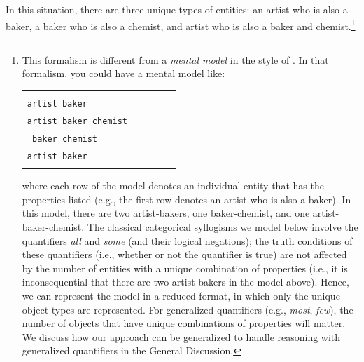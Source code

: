 \documentclass[floatsintext, doc]{apa6}
\begin{document}
\noindent In this situation, there are three unique types of entities: an artist who is also a baker, a baker who is also a chemist, and artist who is also a baker and chemist.\footnote{
This formalism is different from a \emph{mental model} in the style of  . In that formalism, you could have a mental model like:

\begin{tabularx}{.8\textwidth}{XXXXX}
& \\
\tt artist baker \\
\tt artist baker chemist \\
\tt \hspace{1cm} baker chemist \\
\tt artist baker \\
& \\
\end{tabularx}

\noindent where each row of the model denotes an individual entity that has the properties listed (e.g., the first row denotes an artist who is also a baker).
In this model, there are two artist-bakers, one baker-chemist, and one artist-baker-chemist.
The classical categorical syllogisms we model below involve the quantifiers \emph{all} and \emph{some} (and their logical negations); the truth conditions of these quantifiers (i.e., whether or not the quantifier is true) are not affected by the number of entities with a unique combination of properties (i.e., it is inconsequential that there are two artist-bakers in the model above).
Hence, we can represent the model in a reduced format, in which only the unique object types are represented.
For generalized quantifiers (e.g., \emph{most}, \emph{few}), the number of objects that have unique combinations of properties will matter. We discuss how our approach can be generalized to handle reasoning with generalized quantifiers in the General Discussion.
}

\end{document}
